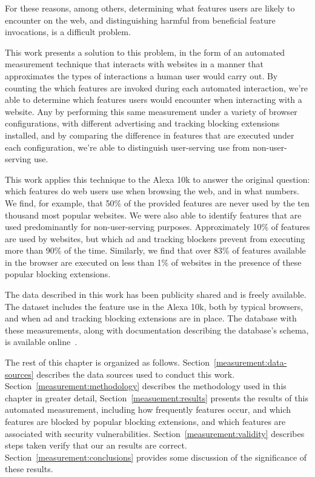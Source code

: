 For these reasons, among others, determining what \WAPI features users are likely
to encounter on the web, and distinguishing harmful from beneficial feature
invocations, is a difficult problem.

This work presents a solution to this problem, in the form of an automated
measurement technique that interacts with websites in a manner that approximates
the types of interactions a human user would carry out.  By counting the
which features are invoked during each automated interaction, we're able
to determine which features users would encounter when interacting with
a website.  Any by performing this same measurement under a variety of
browser configurations, with different advertising and tracking blocking
extensions installed, and by comparing the difference in features that are executed
under each configuration, we're able to distinguish user-serving \WAPI use
from non-user-serving \WAPI use.

This work applies this technique to the Alexa 10k to answer the original
question: which \WAPI features do web users use when browsing the web, and in
what numbers.  We find, for example, that 50\% of the \JS provided
features are never used by the ten thousand most popular websites.  We were also
able to identify features that are used predominantly for non-user-serving
purposes.  Approximately 10\% of features are used by websites, but which ad and
tracking blockers prevent from executing more than 90\% of the time.
Similarly, we find that over 83\% of features available in the browser are
executed on less than 1\% of websites in the presence of these popular blocking
extensions.

The data described in this work has been publicity shared and is freely
available.  The dataset includes the \JS feature use in the Alexa 10k,
both by typical browsers, and when ad and tracking blocking extensions are in
place.  The database with these measurements, along
with documentation describing the database's schema, is available
online~\cite{snyderp2016webapidata}.

The rest of this chapter is organized as follows. Section~\ref{measurement:data-sources}
describes the data sources used to conduct this work.
Section~\ref{measurement:methodology} describes the methodology used
in this chapter in greater detail, Section~\ref{measuement:results} presents the
results of this automated measurement, including how frequently features occur,
and which features are blocked by popular blocking extensions, and which
features are associated with security vulnerabilities.  Section~\ref{measurement:validity}
describes steps taken verify that our  an results are correct. Section~\ref{measurement:conclusions}
provides some discussion of the significance of these results.
